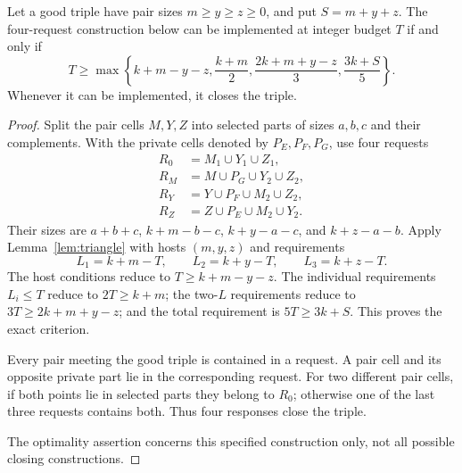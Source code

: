 \begin{lemma}\label{lem:symmetric}
Let a good triple have pair sizes $m\ge y\ge z\ge0$, and put $S=m+y+z$.
The four-request construction below can be implemented at integer
budget $T$ if and only if
\begin{equation}\label{eq:symexact}
 T\ge\max\left\{k+m-y-z,\frac{k+m}{2},
             \frac{2k+m+y-z}{3},\frac{3k+S}{5}\right\}.
\end{equation}
Whenever it can be implemented, it closes the triple.
\end{lemma}
\begin{proof}
Split the pair cells $M,Y,Z$ into selected parts of sizes $a,b,c$ and
their complements. With the private cells denoted by $P_E,P_F,P_G$,
use four requests
\begin{align*}
 R_0&=M_1\cup Y_1\cup Z_1,\\
 R_M&=M\cup P_G\cup Y_2\cup Z_2,\\
 R_Y&=Y\cup P_F\cup M_2\cup Z_2,\\
 R_Z&=Z\cup P_E\cup M_2\cup Y_2.
\end{align*}
Their sizes are $a+b+c$, $k+m-b-c$, $k+y-a-c$, and $k+z-a-b$.
Apply Lemma~\ref{lem:triangle} with hosts $(m,y,z)$ and requirements
\[
 L_1=k+m-T,\qquad L_2=k+y-T,\qquad L_3=k+z-T.
\]
The host conditions reduce to $T\ge k+m-y-z$. The individual
requirements $L_i\le T$ reduce to $2T\ge k+m$; the two-$L$ requirements
reduce to $3T\ge2k+m+y-z$; and the total requirement is
$5T\ge3k+S$. This proves the exact criterion.

Every pair meeting the good triple is contained in a request. A pair
cell and its opposite private part lie in the corresponding request.
For two different pair cells, if both points lie in selected parts they
belong to $R_0$; otherwise one of the last three requests contains both.
Thus four responses close the triple.

The optimality assertion concerns this specified construction only,
not all possible closing constructions.
\end{proof}

